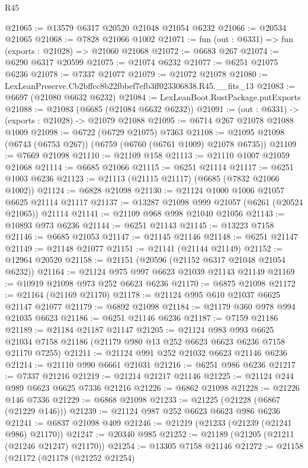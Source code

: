 \begin{lexlean}{R45}
\begin{coremodule}
{@21065 := @13579 @6317 @20520 @21048 @21054 @6232
@21066 := @20534 @21065
@21068 := @7828 @21066 @1002
@21071 := fun (out : @6331) => fun (exports : @21028) => @21060 @21068
@21072 := @6683 @267
@21074 := @6290 @6317 @20599
@21075 := @21074 @6232
@21077 := @6251 @21075 @6236
@21078 := @7337 @21077
@21079 := @21072 @21078
@21080 := LexLeanPreserve.Cb2bffcc8b22fbbef7efb3ff023306838.R45.__fits_13
@21083 := @6697 (@21080 @6632 @6232)
@21084 := LexLeanBoot.RustPackage.putExports
@21088 := @21083 (@6685 (@21084 @6632 @6232))
@21091 := (out : @6331) -> (exports : @21028) -> @21079 @21088
@21095 := @6714 @267 @21078 @21088 @1009
@21098 := @6722 (@6729 @21075) @7363
@21108 := @21095 @21098 (@6743 (@6753 @267)) (@6759 (@6760 (@6761 @1009) @21078 @6735))
@21109 := @7669 @21098
@21110 := @21109 @158
@21113 := @21110 @1007 @21059 @21068
@21114 := @6685 @21066
@21115 := @6251 @21114
@21117 := @6251 @1003 @6236
@21123 := @21113 (@21115 @21117) (@6685 (@7832 @21066 @1002))
@21124 := @6828 @21098
@21130 := @21124 @1000 @1006 @21057 @6625 @21114 @21117
@21137 := @13287 @21098 @999 @21057 (@6261 (@20524 @21065)) @21114
@21141 := @21109 @968 @998 @21040 @21056
@21143 := @10893 @973 @6236
@21144 := @6251 @21143
@21145 := @13223 @7158
@21146 := @6685 @21053
@21147 := @21145 @21146
@21148 := @6251 @21147
@21149 := @21148 @21077
@21151 := @21141 (@21144 @21149)
@21152 := @12964 @20520
@21158 := @21151 (@20596 (@21152 @6317 @21048 @21054 @6232))
@21164 := @21124 @975 @997 @6623 @21039 @21143 @21149
@21169 := @10919 @21098 @973 @252 @6623 @6236
@21170 := @6875 @21098
@21172 := @21164 (@21169 @21170)
@21178 := @21124 @995 @610 @21037 @6625 @21147 @21077
@21179 := @6892 @21098
@21184 := @21179 @360 @978 @994 @21035 @6623
@21186 := @6251 @21146 @6236
@21187 := @7159 @21186
@21189 := @21184 @21187 @21147
@21205 := @21124
    @983
    @993
    @6625
    @21034
    @7158
    @21186
    (@21179 @980 @13 @252 @6623 @6623 @6236 @7158 @21170 @7255)
@21211 := @21124 @991 @252 @21032 @6623 @21146 @6236
@21214 := @21110 @990 @6661 @21031
@21216 := @6251 @986 @6236
@21217 := @7337 @21216
@21219 := @21214 @21217 @21146
@21225 := @21124 @244 @989 @6623 @6625 @7336 @21216
@21226 := @6862 @21098
@21228 := @21226 @146 @7336
@21229 := @6868 @21098
@21233 := @21225 (@21228 (@6867 (@21229 @146)))
@21239 := @21124 @987 @252 @6623 @6623 @986 @6236
@21241 := @6837 @21098 @409
@21246 := @21219 (@21233 (@21239 (@21241 @986) @21170))
@21247 := @20340 @985
@21252 := @21189 (@21205 (@21211 (@21246 @21247) @21170))
@21254 := @13305 @7158 @21146
@21272 := @21158
    (@21172
      (@21178
        (@21252 @21254)
}
\end{coremodule}
\end{lexlean}
